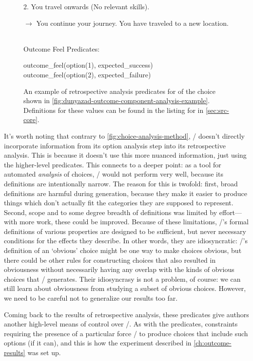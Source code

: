 \begin{enumerate}[leftmargin=1.4em]
\begin{figure}[!b]
{{{\begin{hangparas}{1.3em}{1}
2. You travel onwards (No relevant skills).\\
\ind \parbox{0.88\linewidth}{$\rightarrow$ You continue your journey. \newline You have traveled to a new location.}
\end{hangparas}
} \vind \\
Outcome Feel Predicates:\svind \\
\ind \parbox{0.85\textwidth}{ \tt \raggedright
{} outcome\_feel(option(1), expected\_success) \\
 outcome\_feel(option(2), expected\_failure) \\
}
}
}
\caption[\dunyazad/ retrospective analysis example]{An example of retrospective analysis predicates for of the choice shown in \cref{fig:dunyazad-outcome-component-analysis-example}. Definitions for these  values can be found in the listing for  in \cref{sec:src-core}.}
\label{fig:dunyazad-retrospective-analysis-example}
\end{figure}


It's worth noting that contrary to \cref{fig:choice-analysis-method}, \dunyazad/ doesn't directly incorporate information from its option analysis step into its retrospective analysis.
%
This is because it doesn't use this more nuanced information, just using the higher-level  predicates.
%
This connects to a deeper point: as a tool for automated \emph{analysis} of choices, \dunyazad/ would not perform very well, because its definitions are intentionally narrow.
%
The reason for this is twofold: first, broad definitions are harmful during generation, because they make it easier to produce things which don't actually fit the categories they are supposed to represent.
%
Second, scope and to some degree breadth of definitions was limited by effort---with more work, these could be improved.
%
Because of these limitations, \dunyazad/'s formal definitions of various properties are designed to be sufficient, but never necessary conditions for the effects they describe.
%
In other words, they are idiosyncratic: \dunyazad/'s definition of an `obvious' choice might be one way to make choices obvious, but there could be other rules for constructing choices that also resulted in obviousness without necessarily having any overlap with the kinds of obvious choices that \dunyazad/ generates.
%
Their idiosyncrasy is not a problem, of course: we can still learn about obviousness from studying a subset of obvious choices.
%
However, we need to be careful not to generalize our results too far.


Coming back to the results of retrospective analysis, these  predicates give authors another high-level means of control over \dunyazad/.
%
As with the  predicates, constraints requiring the presence of a particular  force \dunyazad/ to produce choices that include such options (if it can), and this is how the experiment described in \cref{ch:outcome-results} was set up.

\end{enumerate}


